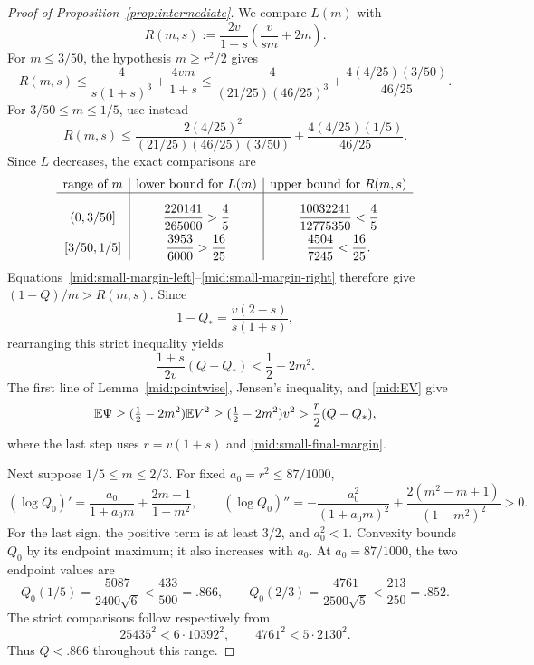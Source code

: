 \begin{proof}[Proof of Proposition~\ref{prop:intermediate}]
We compare \(L(m)\) with
\begin{equation}\label{mid:small-margin-right}
 R(m,s):=\frac{2v}{1+s}\left(\frac{v}{sm}+2m\right).
\end{equation}
For \(m\le3/50\), the hypothesis \(m\ge r^2/2\) gives
\[
 R(m,s)\le\frac4{s(1+s)^3}+\frac{4vm}{1+s}
 \le\frac4{(21/25)(46/25)^3}
     +\frac{4(4/25)(3/50)}{46/25}.
\]
For \(3/50\le m\le1/5\), use instead
\[
 R(m,s)\le
 \frac{2(4/25)^2}{(21/25)(46/25)(3/50)}
 +\frac{4(4/25)(1/5)}{46/25}.
\]
Since \(L\) decreases, the exact comparisons are
\[
\begin{array}{c|c|c}
 \text{range of }m & \text{lower bound for }L(m)
                    &\text{upper bound for }R(m,s)\\ \hline
 \rule{0pt}{22pt}(0,3/50] & \dfrac{220141}{265000}>\dfrac45
          & \dfrac{10032241}{12775350}<\dfrac45\\[7pt]
 [3/50,1/5]&\dfrac{3953}{6000}>\dfrac{16}{25}
           &\dfrac{4504}{7245}<\dfrac{16}{25}.
\end{array}
\]
Equations~\eqref{mid:small-margin-left}--\eqref{mid:small-margin-right}
therefore give \((1-Q)/m>R(m,s)\). Since
\[
 1-Q_* =\frac{v(2-s)}{s(1+s)},
\]
rearranging this strict inequality yields
\begin{equation}\label{mid:small-final-margin}
 \frac{1+s}{2v}(Q-Q_*)<\frac12-2m^2.
\end{equation}
The first line of Lemma~\ref{mid:pointwise}, Jensen's inequality, and
\eqref{mid:EV} give
\[
 \mathbb E\Psi\ge(\tfrac12-2m^2)\mathbb E V^2
           \ge(\tfrac12-2m^2)v^2
           >\frac r2(Q-Q_*),
\]
where the last step uses \(r=v(1+s)\) and
\eqref{mid:small-final-margin}.

Next suppose \(1/5\le m\le2/3\). For fixed
\(a_0=r^2\le87/1000\),
\[
 (\log Q_0)'=\frac{a_0}{1+a_0m}+\frac{2m-1}{1-m^2},\qquad
 (\log Q_0)''=-\frac{a_0^2}{(1+a_0m)^2}
       +\frac{2(m^2-m+1)}{(1-m^2)^2}>0.
\]
For the last sign, the positive term is at least \(3/2\), and
\(a_0^2<1\). Convexity bounds \(Q_0\) by its endpoint maximum;
it also increases with \(a_0\). At \(a_0=87/1000\), the two endpoint
values are
\[
 Q_0(1/5)=\frac{5087}{2400\sqrt6}<\frac{433}{500}=.866,
 \qquad
 Q_0(2/3)=\frac{4761}{2500\sqrt5}<\frac{213}{250}=.852.
\]
The strict comparisons follow respectively from
\[
 25435^2<6\cdot10392^2,\qquad 4761^2<5\cdot2130^2.
\]
Thus \(Q<.866\) throughout this range.


\end{proof}
